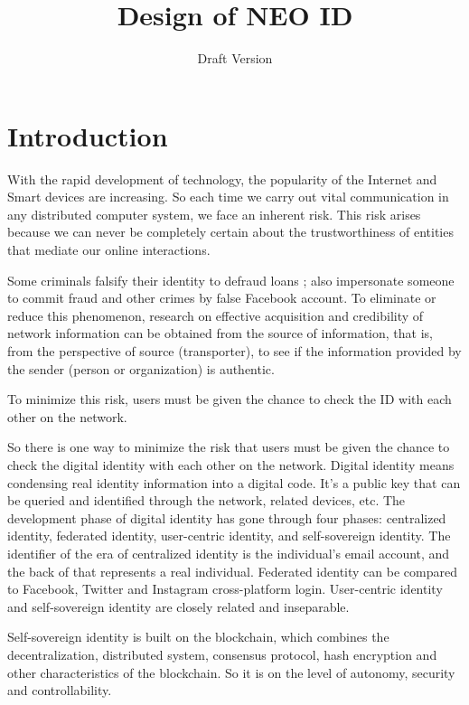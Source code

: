 \documentclass{article}
\begin{document}
\title{Design of NEO ID}
\author{Draft Version}
\date{}
\maketitle


\section{Introduction}

With the rapid development of technology, the popularity of the Internet and Smart devices are increasing. So each time we carry out vital communication
in any distributed computer system, we face an inherent risk. This risk arises because we can never be completely certain about the trustworthiness
of entities that mediate our online interactions.

Some criminals falsify their identity to defraud loans ; also impersonate someone to commit fraud and other crimes by false Facebook account. To
eliminate or reduce this phenomenon, research on effective acquisition and credibility of network information can be obtained from the source of
information, that is, from the perspective of source (transporter), to see if the information provided by the sender (person or organization) is
authentic.

To minimize this risk, users must be given the chance to check the ID with each other on the network.

So there is one way to minimize the risk that users must be given the chance to check the digital identity with each other on the network. Digital
identity means condensing real identity information into a digital code. It{'}s a public key that can be queried and identified through the network,
related devices, etc. The development phase of digital identity has gone through four phases: centralized identity, federated identity, user-centric
identity, and self-sovereign identity. The identifier of the era of centralized identity is the individual{'}s email account, and the back of that
represents a real individual. Federated identity can be compared to Facebook, Twitter and Instagram cross-platform login. User-centric identity and
self-sovereign identity are closely related and inseparable.

Self-sovereign identity is built on the blockchain, which combines the decentralization, distributed system, consensus protocol, hash encryption
and other characteristics of the blockchain. So it is on the level of autonomy, security and controllability.
\end{document}
